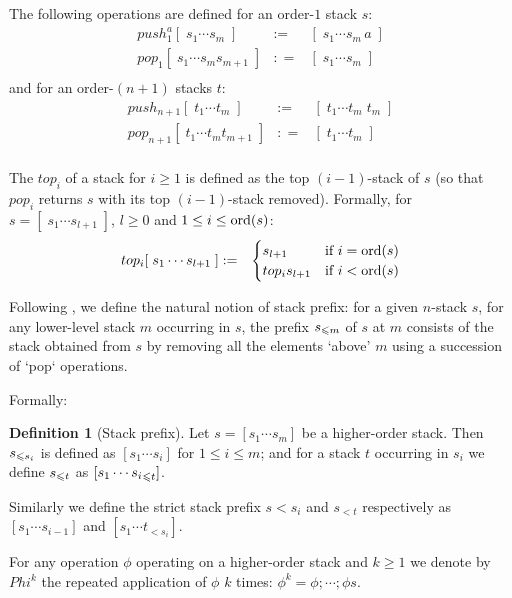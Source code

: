 \documentclass[a4paper]{article}[12pt]
\theoremstyle{remark}
\theoremstyle{definition}
\newtheorem{definition}{Definition}[section]
\begin{document}
The following operations are defined for an order-$1$ stack $s$:
\begin{eqnarray*}
	push_1^{a} [ \; s_1 \cdots s_m \; ] & := & [ \; s_1 \cdots s_m\, a \; ] \\
	pop_1 [ \; s_1 \cdots s_m s_{m+1} \; ] & : = & [ \; s_1 \cdots s_m \; ] \\
\end{eqnarray*}
and for an order-$(n+1)$ stacks $t$:
\begin{eqnarray*}
	push_{n+1} [ \; t_1 \cdots t_m \; ] & := & [ \; t_1 \cdots t_m\; t_m \; ] \\
	pop_{n+1} [ \; t_1 \cdots t_m t_{m+1} \; ] & : = & [ \; t_1 \cdots t_m \; ] \\
\end{eqnarray*}

The $top_i$ of a stack for $i\geq 1$ is defined as the top $(i-1)$-stack of $s$ (so that $pop_i$ returns $s$ with its top $(i-1)$-stack removed).
Formally, for $s=[ \; s_1 \cdots s_{l+1} \; ]$, $l\geq0$ and $1 \leq i\leq \mathop{\mathrm{ord}}(s)$:
\begin{eqnarray*}
	top_{i} [ \; s_1 \cdots s_{l+1} \; ] & := &
	\begin{cases}
		s_{l+1} & \mbox{if $i = \mathop{\mathrm{ord}}(s)$} \\
		top_i s_{l+1} & \mbox{if $i < \mathop{\mathrm{ord}}(s)$}
	\end{cases}
\end{eqnarray*}


Following \cite{hmos-lics08}, we define the natural notion of stack prefix: for a given $n$-stack $s$, for any lower-level stack $m$ occurring in $s$, the prefix $s_{\leqslant m}$ of $s$ at $m$ consists of the stack obtained from $s$ by removing all the elements `above' $m$ using a succession of `pop` operations.

Formally:
\begin{definition}[Stack prefix]
Let $s = [s_1 \cdots s_m]$ be a higher-order stack. Then $s_{\leqslant s_i}$ is defined as $[s_1 \cdots s_i]$ for $1 \leq i \leq m$; and for a stack $t$ occurring in $s_i$ we define $s_{\leqslant t}$ as $[s_1 \cdots {s_i}_{\leqslant t}]$.

Similarly we define the strict stack prefix ${s}{< s_i}$ and $s_{<t}$ respectively as
 $[s_1 \cdots s_{i-1}]$ and $[s_1 \cdots t_{< s_{i}}]$.
\end{definition}

For any operation $\phi$ operating on a higher-order stack and $k\geq1$ we denote by $Phi^k$ the repeated application of $\phi$ $k$ times: $\phi^k = \phi ; \cdots; \phi s$.
\end{document}
